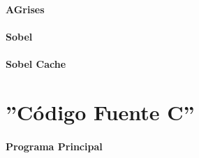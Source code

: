 \documentclass[a4paper,12pt,titlepage,final]{book}
\begin{document}
\subsubsection{AGrises}

\subsubsection{Sobel}

\subsubsection{Sobel Cache}


\chapter{''Código Fuente C''}
\subsubsection{Programa Principal}
\lstset{
language=c
}


\backmatter



\end{document}
